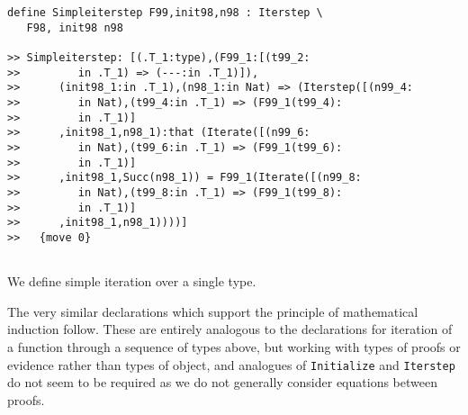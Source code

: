 \documentclass[12pt]{article}
\begin{document}
\begin{verbatim}
define Simpleiterstep F99,init98,n98 : Iterstep \
   F98, init98 n98

>> Simpleiterstep: [(.T_1:type),(F99_1:[(t99_2:
>>         in .T_1) => (---:in .T_1)]),
>>      (init98_1:in .T_1),(n98_1:in Nat) => (Iterstep([(n99_4:
>>         in Nat),(t99_4:in .T_1) => (F99_1(t99_4):
>>         in .T_1)]
>>      ,init98_1,n98_1):that (Iterate([(n99_6:
>>         in Nat),(t99_6:in .T_1) => (F99_1(t99_6):
>>         in .T_1)]
>>      ,init98_1,Succ(n98_1)) = F99_1(Iterate([(n99_8:
>>         in Nat),(t99_8:in .T_1) => (F99_1(t99_8):
>>         in .T_1)]
>>      ,init98_1,n98_1))))]
>>   {move 0}


\end{verbatim}

We define simple iteration over a single type.


The very similar declarations which support the principle of mathematical induction follow.  These are entirely analogous to the declarations for iteration of a function through a sequence of types above, but working with types of proofs or evidence rather than types of object, and analogues of {\tt Initialize} and
{\tt Iterstep} do not seem to be required as we do not generally consider equations between proofs.
\end{document}

